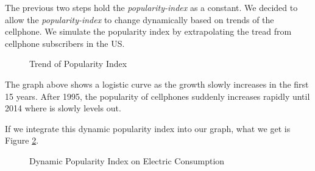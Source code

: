 \documentclass{article}
\begin{document}
The previous two steps hold the \textit{popularity-index} as a constant. We decided to allow the \textit{popularity-index} to change dynamically based on trends of the cellphone. We simulate the popularity index by extrapolating the tread from cellphone subscribers in the US. \cite{subscribers} \par

\begin{figure}[!ht]
    \caption{Trend of Popularity Index}
    \label{7}
\end{figure}

The graph above shows a logistic curve as the growth slowly increases in the first 15 years. After 1995, the popularity of cellphones suddenly increases rapidly until 2014 where is slowly levels out. \par

If we integrate this dynamic popularity index into our graph, what we get is Figure \ref{8}.\pagebreak

\begin{figure}[!ht]
    \caption{Dynamic Popularity Index on Electric Consumption}
    \label{8}
\end{figure}
\end{document}
